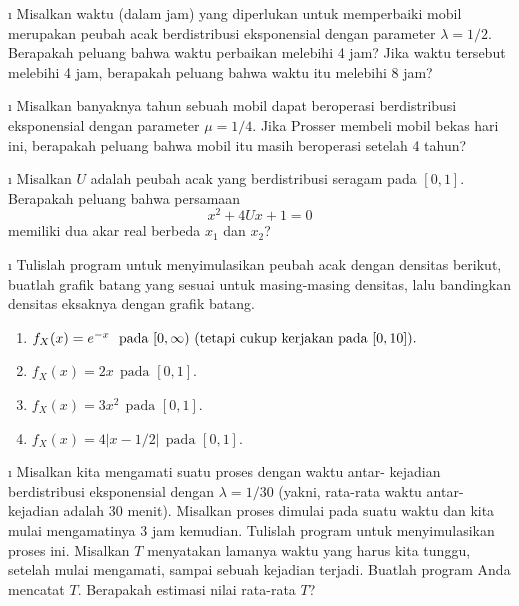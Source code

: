 \begin{LJSItem}
\i\label{5.2.28} Misalkan waktu (dalam jam) yang diperlukan untuk memperbaiki mobil
merupakan peubah acak berdistribusi eksponensial dengan parameter $\lambda = 1/2$.
Berapakah peluang bahwa waktu perbaikan melebihi 4 jam?  Jika waktu tersebut melebihi
4 jam, berapakah peluang bahwa waktu itu melebihi 8 jam?

\i\label{5.2.29} Misalkan banyaknya tahun sebuah mobil dapat beroperasi berdistribusi
eksponensial dengan parameter $\mu = 1/4$.  Jika Prosser membeli mobil bekas hari ini,
berapakah peluang bahwa mobil itu masih beroperasi setelah 4 tahun?

\i\label{5.2.30} Misalkan $U$ adalah peubah acak yang berdistribusi seragam pada
$[0,1]$.  Berapakah peluang bahwa persamaan
$$ x^2 + 4Ux + 1 = 0
$$ memiliki dua akar real berbeda $x_1$ dan $x_2$?

\i\label{exer 5.2.31} Tulislah program untuk menyimulasikan peubah acak dengan
densitas berikut, buatlah grafik batang yang sesuai untuk masing-masing densitas, lalu
bandingkan densitas eksaknya dengan grafik batang.

\begin{enumerate}
\item $f_X(x) = e^{-x}\ \  \mbox{pada}\,\, [0,\infty)\,\, 
(\mbox{tetapi\,\,cukup\,\,kerjakan\,\,pada\,\,} [0,10]).$

\item $f_X(x) = 2x\ \ \mbox{pada}\,\, [0,1].$

\item $f_X(x) = 3x^2\ \ \mbox{pada}\,\, [0,1].$

\item $f_X(x) = 4|x - 1/2|\ \ \mbox{pada}\,\, [0,1].$
\end{enumerate}

\i\label{exer 5.2.32} Misalkan kita mengamati suatu proses dengan waktu antar-
kejadian berdistribusi eksponensial dengan $\lambda = 1/30$ (yakni, rata-rata waktu
antar-kejadian adalah 30 menit).  Misalkan proses dimulai pada suatu waktu dan kita
mulai mengamatinya 3 jam kemudian.  Tulislah program untuk menyimulasikan proses ini.
Misalkan $T$ menyatakan lamanya waktu yang harus kita tunggu, setelah mulai mengamati,
sampai sebuah kejadian terjadi.  Buatlah program Anda mencatat $T$.  Berapakah
estimasi nilai rata-rata $T$?


\end{LJSItem}
